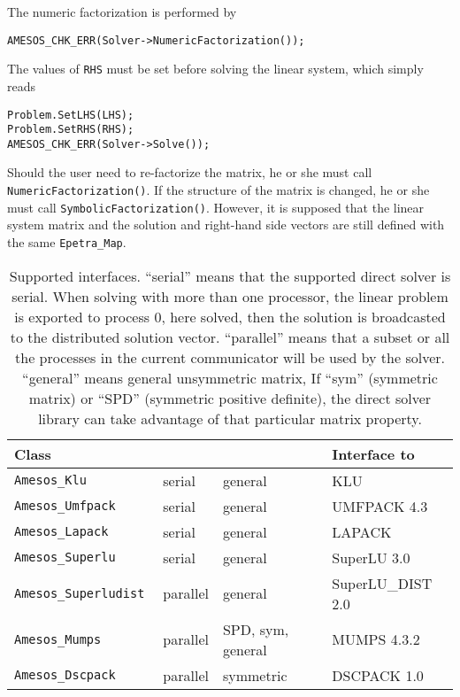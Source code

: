 \documentclass[11pt]{SANDreport}
\begin{document}
The numeric factorization is performed by
\begin{verbatim}
AMESOS_CHK_ERR(Solver->NumericFactorization());
\end{verbatim}

The values of \verb!RHS! must be set before solving the linear system, which
simply reads
\begin{verbatim}
Problem.SetLHS(LHS);
Problem.SetRHS(RHS);
AMESOS_CHK_ERR(Solver->Solve());
\end{verbatim}

Should the user need to re-factorize the matrix, he or she must call
\verb!NumericFactorization()!. If the structure of the matrix is changed,
he or she must call \verb!SymbolicFactorization()!. However, it is supposed
that the linear system matrix and the solution and right-hand side vectors
are still defined with the same \verb!Epetra_Map!.

\begin{table}[tbhp]
  \centering
  \begin{tabular}{| l | l l l | }
    \hline
    Class &   &  & Interface to \\
    \hline
    \tt Amesos\_Klu          & serial   & general & KLU \\
    \tt Amesos\_Umfpack      & serial   & general & UMFPACK 4.3 \\
    \tt Amesos\_Lapack       & serial   & general & LAPACK \\
    \tt Amesos\_Superlu      & serial   & general & SuperLU 3.0 \\
    \tt  Amesos\_Superludist & parallel & general & SuperLU\_DIST 2.0 \\
    \tt Amesos\_Mumps        & parallel & SPD, sym, general & MUMPS 4.3.2 \\
    \tt Amesos\_Dscpack      & parallel & symmetric & DSCPACK 1.0 \\
    \hline
  \end{tabular}
  \caption{Supported interfaces. ``serial'' means that the supported
    direct solver is serial. When solving with 
    more than one processor, the linear problem is exported to process
    0, here solved, then the solution is broadcasted to the distributed
    solution 
    vector. ``parallel'' means that a subset or all the processes in the current
    communicator will be used by the solver. ``general'' means general
    unsymmetric 
    matrix, If ``sym'' (symmetric matrix) or  ``SPD'' (symmetric
    positive definite), the direct solver library can take advantage of
    that particular matrix property.}
  \label{tab:classes}
\end{table}
\end{document}

